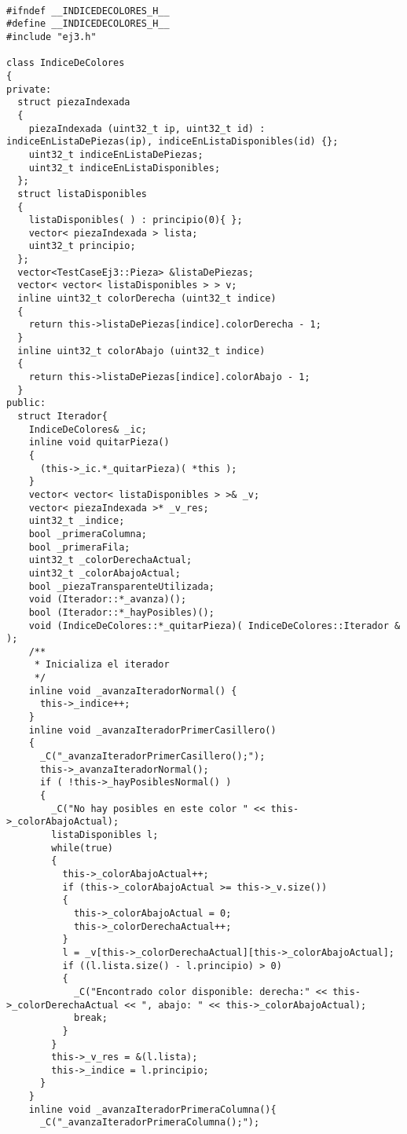 \documentclass[11pt, a4paper, twoside]{article}
\begin{document}
\begin{lstlisting}

#ifndef __INDICEDECOLORES_H__
#define __INDICEDECOLORES_H__
#include "ej3.h"

class IndiceDeColores 
{
private:
  struct piezaIndexada
  {
    piezaIndexada (uint32_t ip, uint32_t id) : indiceEnListaDePiezas(ip), indiceEnListaDisponibles(id) {};
    uint32_t indiceEnListaDePiezas;
    uint32_t indiceEnListaDisponibles;
  };
  struct listaDisponibles
  {
    listaDisponibles( ) : principio(0){ };
    vector< piezaIndexada > lista;
    uint32_t principio;
  };
  vector<TestCaseEj3::Pieza> &listaDePiezas;
  vector< vector< listaDisponibles > > v;
  inline uint32_t colorDerecha (uint32_t indice)
  {
    return this->listaDePiezas[indice].colorDerecha - 1;
  }
  inline uint32_t colorAbajo (uint32_t indice)
  {
    return this->listaDePiezas[indice].colorAbajo - 1;
  }
public:
  struct Iterador{
    IndiceDeColores& _ic;
    inline void quitarPieza()
    {
      (this->_ic.*_quitarPieza)( *this );
    }
    vector< vector< listaDisponibles > >& _v;
    vector< piezaIndexada >* _v_res;
    uint32_t _indice;
    bool _primeraColumna;
    bool _primeraFila;
    uint32_t _colorDerechaActual;
    uint32_t _colorAbajoActual;
    bool _piezaTransparenteUtilizada;
    void (Iterador::*_avanza)();
    bool (Iterador::*_hayPosibles)();
    void (IndiceDeColores::*_quitarPieza)( IndiceDeColores::Iterador & );
    /**
     * Inicializa el iterador
     */
    inline void _avanzaIteradorNormal() {
      this->_indice++;
    }
    inline void _avanzaIteradorPrimerCasillero()
    {
      _C("_avanzaIteradorPrimerCasillero();");
      this->_avanzaIteradorNormal();
      if ( !this->_hayPosiblesNormal() )
      {
        _C("No hay posibles en este color " << this->_colorAbajoActual);
        listaDisponibles l;
        while(true)
        {
          this->_colorAbajoActual++;
          if (this->_colorAbajoActual >= this->_v.size())
          {
            this->_colorAbajoActual = 0;
            this->_colorDerechaActual++;
          }
          l = _v[this->_colorDerechaActual][this->_colorAbajoActual];
          if ((l.lista.size() - l.principio) > 0)
          {
            _C("Encontrado color disponible: derecha:" << this->_colorDerechaActual << ", abajo: " << this->_colorAbajoActual);
            break;
          }
        }
        this->_v_res = &(l.lista);
        this->_indice = l.principio;
      }
    }
    inline void _avanzaIteradorPrimeraColumna(){
      _C("_avanzaIteradorPrimeraColumna();");

\end{lstlisting}
\end{document}

